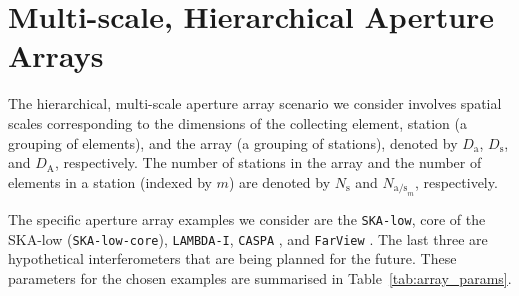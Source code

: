 \documentclass[
  journal=pasa,
  manuscript=article-type,
  year=2020,
  volume=37,
]{cup-journal}
\begin{document}



\section{Multi-scale, Hierarchical Aperture Arrays} \label{sec:multi-scale-arrays}

The hierarchical, multi-scale aperture array scenario we consider involves spatial scales corresponding to the dimensions of the collecting element, station (a grouping of elements), and the array (a grouping of stations), denoted by $D_\textrm{a}$, $D_\textrm{s}$, and $D_\textrm{A}$, respectively. The number of stations in the array and the number of elements in a station (indexed by $m$) are denoted by $N_\textrm{s}$ and $N_{\textrm{a/s}_m}$, respectively. 

The specific aperture array examples we consider are the \texttt{SKA-low}, core of the SKA-low (\texttt{SKA-low-core}), \texttt{LAMBDA-I}, \texttt{CASPA} \citep{Luo+2024}, and \texttt{FarView} \citep{Polidan+2024}. The last three are hypothetical interferometers that are being planned for the future. 
These parameters for the chosen examples are summarised in Table~\ref{tab:array_params}. 
\end{document}

